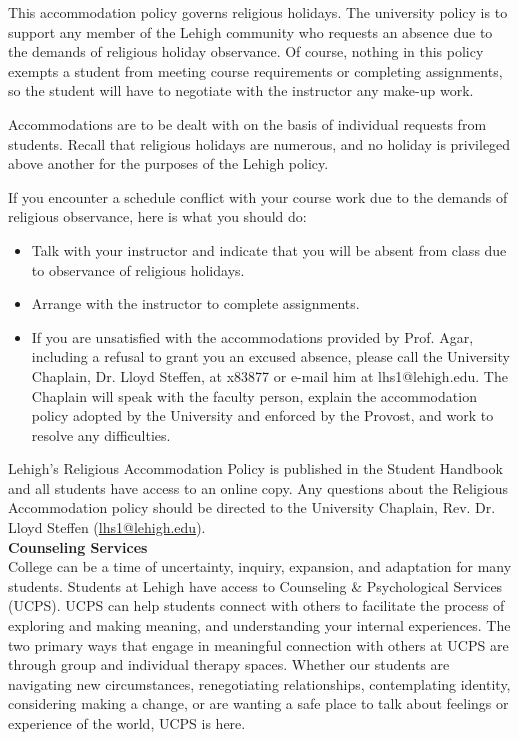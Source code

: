 \documentclass[11pt,letterpaper]{article}
\newcommand{\lefthead}[2]{\noindent\textbf{#1}\hfill\\[#2]}
\begin{document}
This accommodation policy governs religious holidays. The university policy is to support any member of the Lehigh community who requests an absence due to the demands of religious holiday observance. Of course, nothing in this policy exempts a student from meeting course requirements or completing assignments, so the student will have to negotiate with the instructor any make-up work.

Accommodations are to be dealt with on the basis of individual requests from students. Recall that religious holidays are numerous, and no holiday is privileged above another for the purposes of the Lehigh policy.

If you encounter a schedule conflict with your course work due to the demands of religious observance, here is what you should do:

 \begin{itemize}
     \item Talk  with your instructor and indicate that you will be absent from class due to observance of religious holidays.
     \item Arrange with the instructor to complete assignments.
     \item If you are unsatisfied with the accommodations provided by Prof. Agar, including a refusal to grant you an excused absence, please call the University Chaplain, Dr. Lloyd Steffen, at x83877 or e-mail him at lhs1@lehigh.edu. The  Chaplain will speak with the faculty person, explain the accommodation policy adopted by the University and enforced by the Provost, and work to resolve any difficulties.
 \end{itemize}


Lehigh’s Religious Accommodation Policy is published in the Student Handbook and all students have access to an online copy. Any questions about the Religious Accommodation policy should be directed to the University Chaplain, Rev. Dr. Lloyd Steffen (\href{lhs1@lehigh.edu}{lhs1@lehigh.edu}). \\[0.3cm]





\lefthead{Counseling Services}{0.3cm}
\noindent College can be a time of uncertainty, inquiry, expansion, and adaptation for many students. Students at Lehigh have access to Counseling & Psychological Services (UCPS). UCPS can help students connect with others to facilitate the process of exploring and making meaning, and understanding your internal experiences. The two primary ways that engage in meaningful connection with others at UCPS are through group and individual therapy spaces. Whether our students are navigating new circumstances, renegotiating relationships, contemplating identity, considering making a change, or are wanting a safe place to talk about feelings or experience of the world, UCPS is here.
\end{document}
